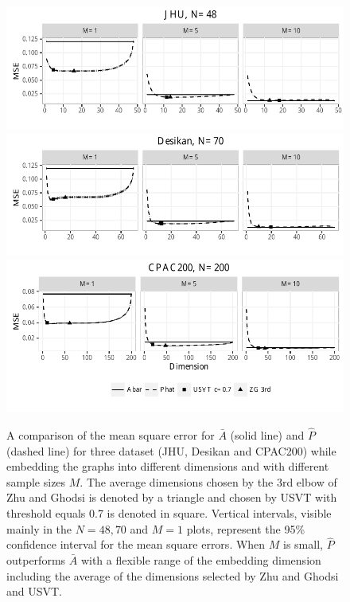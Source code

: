 \documentclass[10pt,letterpaper]{article}
\begin{document}
\begin{figure}[!htb]
\centering
\includegraphics[width=1\textwidth]{corr_data_MSE_jhu.pdf}\\
\includegraphics[width=1\textwidth]{corr_data_MSE_desikan.pdf}\\
\includegraphics[width=1\textwidth]{corr_data_MSE_CPAC200.pdf}
\caption{A comparison of the mean square error for $\bar{A}$ (solid line) and $\hat{P}$ (dashed line) for three dataset (JHU, Desikan and CPAC200) while embedding the graphs into different dimensions and with different sample sizes $M$. The average dimensions chosen by the 3rd elbow of Zhu and Ghodsi is denoted by a triangle
 and chosen by USVT with threshold equals 0.7 is denoted in square.
 Vertical intervals, visible mainly in the $N=48,70$ and $M=1$ plots, represent the 95\% confidence interval for the mean square errors.  When $M$ is small, $\hat{P}$ outperforms $\bar{A}$ with a flexible range of the embedding dimension including the average of the dimensions selected by Zhu and Ghodsi and USVT.}
\label{fig:realdata}
\end{figure}
\end{document}

